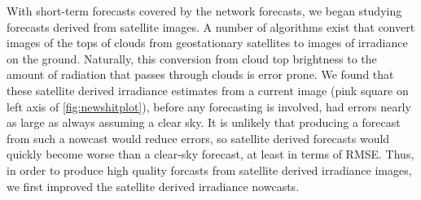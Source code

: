 With short-term forecasts covered by the network forecasts, we began
studying forecasts derived from satellite images.
A number of algorithms exist that convert images of the tops of clouds
from geostationary satellites to images of irradiance on the ground.
Naturally, this conversion from cloud top brightness to the amount of
radiation that passes through clouds is error prone.
We found that these satellite derived irradiance estimates from a
current image (pink square on left axis of \cref{fig:newshitplot}),
before any forecasting is involved, had errors nearly as large as
always assuming a clear sky.
It is unlikely that producing a forecast from such a nowcast would
reduce errors, so satellite derived forecasts would quickly become
worse than a clear-sky forecast, at least in terms of RMSE.
Thus, in order to produce high quality forcasts from satellite derived
irradiance images, we first improved the satellite derived irradiance
nowcasts.

\begin{figure}[h]
\end{figure}

